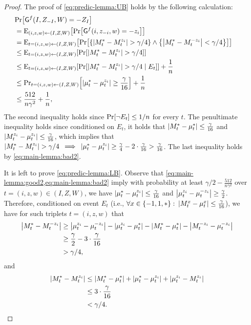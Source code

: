 {\begin{proof}
	The proof of \cref{eq:predic-lemma:UB} holds by the following calculation:
	\begin{align*}
		\lefteqn{\pr{\Gc^f(I,Z_{-I},W) = -Z_I}}\\
		&= \eex{(i,z,w) \la (I,Z,W)}{\pr{\Gc^f(i,z_{-i},w) = -z_i}}\\
		&= \eex{t = (i,z,w) \la (I,Z,W)}{\pr{\set{\size{M_t^* - M_t^{z_i}} > \gamma/4} \land \set{\size{M_t^* - M_t^{-z_i}} < \gamma/4}}}\\
		&\leq \eex{t =(i,z,w) \la (I,Z,W)}{\pr{\size{M_t^* - M_t^{z_i}} > \gamma/4}}\\
		&\leq \eex{t = (i,z,w) \la (I,Z,W)}{\pr{\size{M_t^* - M_t^{z_i}} > \gamma/4 \mid E_t}} + \frac{1}{n}\\
		&\leq \ppr{t = (i,z,w) \la (I,Z,W)}{\size{\mu_t^* -  \mu_t^{z_i}} \geq \frac{\gamma}{16}} + \frac{1}{n}\\
		&\leq \frac{512}{n \gamma^2} + \frac1n,
	\end{align*}
	The second inequality holds since $\pr{\neg E_t} \leq 1/n$ for every $t$. The penultimate inequality holds since conditioned on $E_t$, it holds that $\size{M_t^* - \mu_t^*} \leq \frac{\gamma}{16}$ and $\size{M_t^{z_i} - \mu_t^{z_i}} \leq \frac{\gamma}{16}$, which implies that $\size{M_t^* - M_t^{z_i}} > \gamma/4 \: \implies \: \size{\mu_t^* -  \mu_t^{z_i}} \geq \frac{\gamma}{4} - 2\cdot \frac{\gamma}{16} > \frac{\gamma}{16}$. The last inequality holds by \cref{eq:main-lemma:bad2}.
	
	It is left to prove \cref{eq:predic-lemma:LB}. 
	Observe that \cref{eq:main-lemma:good2,eq:main-lemma:bad2} imply with probability at least $\gamma/2 - \frac{512}{n \gamma^2}$ over $t = (i,z,w)\in (I,Z,W)$, we have $\size{\mu_t^* -  \mu_t^{z_i}} \leq  \frac{\gamma}{16}$ and $\size{\mu_t^{z_i}- \mu_t^{-z_i}} \geq\frac{\gamma}{2}$. Therefore, conditioned on event $E_t$ (i.e., $\forall x \in \set{-1,1,*}: \: \size{M_t^{x} - \mu_t^{x}} \leq \frac{\gamma}{16}$), we have for such triplets $t = (i,z,w)$ that 
	\begin{align*}
		\size{M_t^* - M_t^{-z_i}} 
		& \geq \size{\mu_t^{z_i} - \mu_t^{-z_i}} - \size{\mu_t^{z_i} - \mu_t^*} - \size{M_t^*  - \mu_t^*} -  \size{M_t^{-z_i} - \mu_t^{-z_i}}\\
		&\geq \frac{\gamma}{2} - 3\cdot \frac{\gamma}{16}\\
		&> \gamma/4,
	\end{align*}
	and 
	\begin{align*}
		\size{M_t^* - M_t^{z_i}}
		&\leq  \size{M_t^* - \mu_t^*} + \size{\mu_t^* - \mu_t^{z_i}} + \size{\mu_t^{z_i} - M_t^{z_i}} \\
		&\leq 3\cdot \frac{\gamma}{16}\\
		&< \gamma/4.
	\end{align*}
	

\end{proof}}
